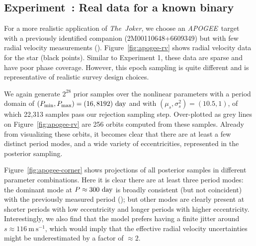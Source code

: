\documentclass[manuscript, letterpaper]{aastex6}
\newcommand{\project}[1]{\textsl{#1}}
\newcommand{\acronym}[1]{{\small{#1}}}
\newcommand{\apogee}{\project{\acronym{APOGEE}}}
\newcommand{\samplername}{\project{The~Joker}}
\newcommand{\figname}{Figure}
\newcommand{\mps}{\mathrm{m}~\mathrm{s}^{-1}}
\newcounter{expcounter}
\begin{document}
\subsection{Experiment~: Real data for a known binary}
\label{sec:apogee}

For a more realistic application of \samplername, we choose an \apogee\ target
with a previously identified companion (2M00110648+6609349) but with few radial
velocity measurements (\citealt{Troup:2016}).
\figname~\ref{fig:apogee-rv} shows radial velocity data for the star (black
points). %
Similar to Experiment 1, these data are sparse and have poor phase coverage.
However, this epoch sampling is quite different and is representative of realistic
survey design choices.

We again generate $2^{28}$ prior samples over the nonlinear parameters with a
period domain of $(P_{\rm min}, P_{\rm max}) = (16, 8192)~{\rm day}$ and with
$(\mu_s,\sigma^2_s) = (10.5,1)$, of which 22,313 samples pass our rejection
sampling step.
Over-plotted as grey lines on \figname~\ref{fig:apogee-rv} are 256 orbits
computed from these samples.
Already from visualizing these orbits, it becomes clear that there are at least a few
distinct period modes, and a wide variety of eccentricities, represented in the
posterior sampling.

\figname~\ref{fig:apogee-corner} shows projections of all posterior samples in
different parameter combinations.
Here it is clear there are at least three period modes: the dominant mode at $P
\approx 300~{\rm day}$ is broadly consistent (but not coincident) with the previously measured period
(\citealt{Troup:2016}); but other modes are clearly present at shorter periods
with low eccentricity and longer periods with higher eccentricity.
Interestingly, we also find that the model prefers having a finite jitter
around $s \approx 116~\mps$, which would imply that the effective radial velocity
uncertainties might be underestimated by a factor of $\approx 2$.
\end{document}
